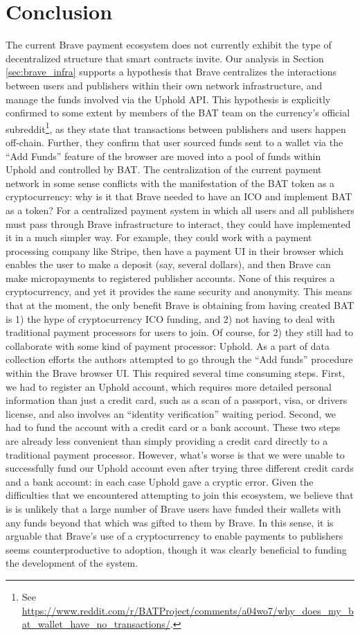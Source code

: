 \documentclass[sigconf]{acmart}
\begin{document}
\section{Conclusion}
The current Brave payment ecosystem does not currently exhibit the 
type of decentralized structure that smart contracts invite.
Our analysis in Section \ref{sec:brave_infra} supports a
hypothesis that Brave centralizes the interactions between
users and publishers within their own network infrastructure,
and manage the funds involved via the Uphold API.
This hypothesis is explicitly confirmed to some extent by
members of the BAT team on the currency's
official subreddit\footnote{See \url{https://www.reddit.com/r/BATProject/comments/a04wo7/why\_does\_my\_bat\_wallet\_have\_no\_transactions/}.}, as they state that transactions between
publishers and users happen off-chain.
Further, they confirm that user sourced funds sent to a wallet
via the ``Add Funds'' feature of the browser are moved into
a pool of funds within Uphold and controlled by BAT.
The centralization of the current payment network in some sense
conflicts with the manifestation of the BAT token as a cryptocurrency:
why is it that Brave needed to have an ICO and implement BAT as a token?
For a centralized payment system in which all users and all publishers
must pass through Brave infrastructure to interact, they could have
implemented it in a much simpler way. For example, they could
work with a payment processing company like Stripe, then
have a payment UI in their browser which enables the user to make
a deposit (say, several dollars), and then Brave can make
micropayments to registered publisher accounts. None of this
requires a cryptocurrency, and yet it provides the same security and
anonymity. This means that at the moment, the only benefit Brave
is obtaining from having created BAT is 1) the hype of cryptocurrency
ICO funding, and 2) not having to deal with traditional payment
processors for users to join. Of course, for 2) they still
had to collaborate with some kind of payment processor: Uphold.
As a part of data collection efforts the authors attempted to
go through the ``Add funds'' procedure within the Brave browser
UI. This required several time consuming steps.
First, we had to register an Uphold account, which
requires more detailed personal information than just a credit card,
such as a scan of a passport, visa, or drivers license, and
also involves an ``identity verification'' waiting period.
Second, we had to fund the account with a credit card or a
bank account. These two steps are already less convenient than
simply providing a credit card directly to a traditional payment processor.
However, what's worse is that we were unable to successfully fund our Uphold account
even after trying three different credit cards and a bank account:
in each case Uphold gave a cryptic error.
Given the difficulties that we encountered attempting to join this ecosystem,
we believe that is is unlikely that a large number of Brave users
have funded their wallets with any funds beyond that which was
gifted to them by Brave. In this sense,
it is arguable that Brave's
use of a cryptocurrency to enable payments to publishers seems
counterproductive to adoption, though it was clearly
beneficial to funding the development of the system.
\end{document}
